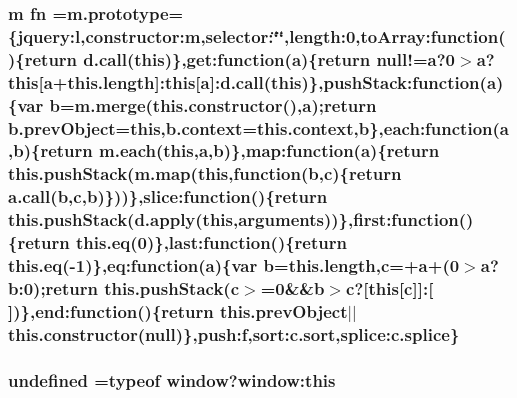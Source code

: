 \subsubsection[{fn}]{\setlength{\rightskip}{0pt plus 5cm}m fn =m.\+prototype=\{jquery\+:l,constructor\+:m,selector\+:\char`\"{}\char`\"{},length\+:0,to\+Array\+:function()\{return d.\+call(this)\},get\+:function({\bf a})\{return null!={\bf a}?0$>${\bf a}?this\mbox{[}{\bf a}+this.\+length\mbox{]}\+:this\mbox{[}{\bf a}\mbox{]}\+:d.\+call(this)\},push\+Stack\+:function({\bf a})\{var {\bf b}=m.\+merge(this.\+constructor(),{\bf a});return b.\+prev\+Object=this,b.\+context=this.\+context,{\bf b}\},each\+:function({\bf a},{\bf b})\{return {\bf m.\+each}(this,{\bf a},{\bf b})\},map\+:function({\bf a})\{return this.\+push\+Stack(m.\+map(this,function({\bf b},{\bf c})\{return a.\+call({\bf b},{\bf c},{\bf b})\}))\},slice\+:function()\{return this.\+push\+Stack(d.\+apply(this,arguments))\},first\+:function()\{return this.\+eq(0)\},last\+:function()\{return this.\+eq(-\/1)\},eq\+:function({\bf a})\{var {\bf b}=this.\+length,{\bf c}=+{\bf a}+(0$>${\bf a}?b\+:0);return this.\+push\+Stack({\bf c}$>$=0\&\&{\bf b}$>${\bf c}?\mbox{[}this\mbox{[}{\bf c}\mbox{]}\mbox{]}\+:\mbox{[}$\,$\mbox{]})\},end\+:function()\{return this.\+prev\+Object$\vert$$\vert$this.\+constructor(null)\},push\+:f,sort\+:c.\+sort,splice\+:c.\+splice\}}\label{application_2assets_2js_2jquery-1_811_82_8min_8js_ab2836ee14921cbd6e34ea91a9a99ad66}
\hypertarget{application_2assets_2js_2jquery-1_811_82_8min_8js_ae21cc36bf0d65014c717a481a3f8a468}{}
\subsubsection[{undefined}]{\setlength{\rightskip}{0pt plus 5cm}undefined =typeof window?window\+:this}\label{application_2assets_2js_2jquery-1_811_82_8min_8js_ae21cc36bf0d65014c717a481a3f8a468}
